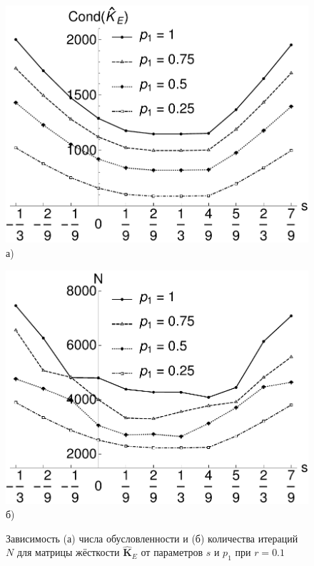 \begin{figure}[ht]
    \begin{minipage}[b][][b]{0.49\linewidth}\centering
        \includegraphics[width=\linewidth]{pics/MechanicalCond.pdf} \\ а)
    \end{minipage}
    \hfill
    \begin{minipage}[b][][b]{0.49\linewidth}\centering
        \includegraphics[width=\linewidth]{pics/MechanicalIter.pdf} \\ б)
    \end{minipage}
    \caption{Зависимость (а) числа обусловленности и (б) количества итераций $N$ для матрицы жёсткости $\widehat{\textbf{K}}_E$ от параметров $s$ и $p_1$ при $r = 0.1$}
    \label{fig:MechanicalCondAndIter}
\end{figure}

